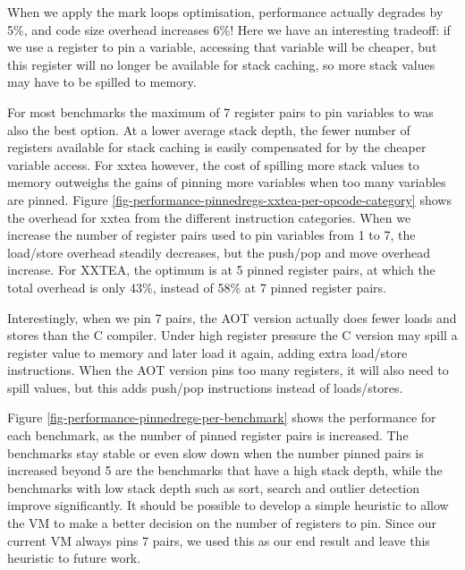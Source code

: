 When we apply the mark loops optimisation, performance actually degrades by 5\%, and code size overhead increases 6\%! Here we have an interesting tradeoff: if we use a register to pin a variable, accessing that variable will be cheaper, but this register will no longer be available for stack caching, so more stack values may have to be spilled to memory.

For most benchmarks the maximum of 7 register pairs to pin variables to was also the best option. At a lower average stack depth, the fewer number of registers available for stack caching is easily compensated for by the cheaper variable access. For xxtea however, the cost of spilling more stack values to memory outweighs the gains of pinning more variables when too many variables are pinned. Figure \ref{fig-performance-pinnedregs-xxtea-per-opcode-category} shows the overhead for xxtea from the different instruction categories. When we increase the number of register pairs used to pin variables from 1 to 7, the load/store overhead steadily decreases, but the push/pop and move overhead increase. For XXTEA, the optimum is at 5 pinned register pairs, at which the total overhead is only 43\%, instead of 58\% at 7 pinned register pairs.

 Interestingly, when we pin 7 pairs, the AOT version actually does fewer loads and stores than the C compiler. Under high register pressure the C version may spill a register value to memory and later load it again, adding extra load/store instructions. When the AOT version pins too many registers, it will also need to spill values, but this adds push/pop instructions instead of loads/stores.

Figure \ref{fig-performance-pinnedregs-per-benchmark} shows the performance for each benchmark, as the number of pinned register pairs is increased. The benchmarks stay stable or even slow down when the number pinned pairs is increased beyond 5 are the benchmarks that have a high stack depth, while the benchmarks with low stack depth such as sort, search and outlier detection improve significantly. It should be possible to develop a simple heuristic to allow the VM to make a better decision on the number of registers to pin. Since our current VM always pins 7 pairs, we used this as our end result and leave this heuristic to future work.

